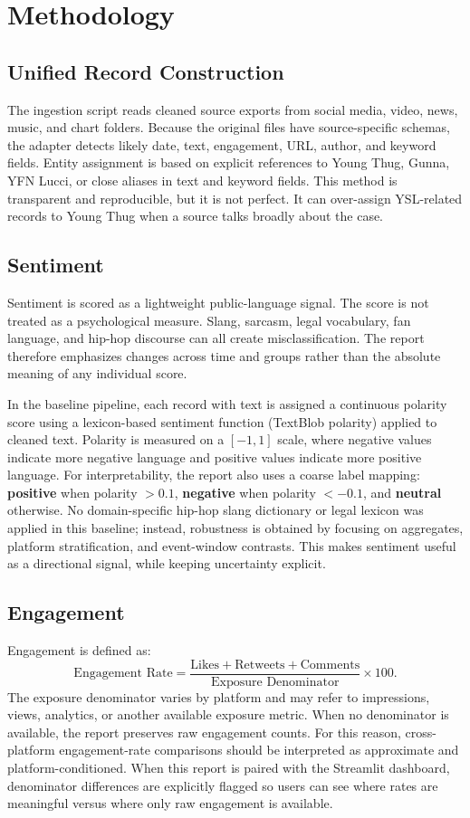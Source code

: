 \documentclass[12pt]{article}
\begin{document}
\section{Methodology}
\subsection{Unified Record Construction}
The ingestion script reads cleaned source exports from social media, video, news, music, and chart folders. Because the original files have source-specific schemas, the adapter detects likely date, text, engagement, URL, author, and keyword fields. Entity assignment is based on explicit references to Young Thug, Gunna, YFN Lucci, or close aliases in text and keyword fields. This method is transparent and reproducible, but it is not perfect. It can over-assign YSL-related records to Young Thug when a source talks broadly about the case.

\subsection{Sentiment}
Sentiment is scored as a lightweight public-language signal. The score is not treated as a psychological measure. Slang, sarcasm, legal vocabulary, fan language, and hip-hop discourse can all create misclassification. The report therefore emphasizes changes across time and groups rather than the absolute meaning of any individual score.

In the baseline pipeline, each record with text is assigned a continuous polarity score using a lexicon-based sentiment function (TextBlob polarity) applied to cleaned text. Polarity is measured on a \([-1, 1]\) scale, where negative values indicate more negative language and positive values indicate more positive language. For interpretability, the report also uses a coarse label mapping: \textbf{positive} when polarity \(> 0.1\), \textbf{negative} when polarity \(< -0.1\), and \textbf{neutral} otherwise. No domain-specific hip-hop slang dictionary or legal lexicon was applied in this baseline; instead, robustness is obtained by focusing on aggregates, platform stratification, and event-window contrasts. This makes sentiment useful as a directional signal, while keeping uncertainty explicit.

\subsection{Engagement}
Engagement is defined as:
\[
\text{Engagement Rate}
=
\frac{\text{Likes} + \text{Retweets} + \text{Comments}}
{\text{Exposure Denominator}}
\times 100.
\]
The exposure denominator varies by platform and may refer to impressions, views, analytics, or another available exposure metric. When no denominator is available, the report preserves raw engagement counts. For this reason, cross-platform engagement-rate comparisons should be interpreted as approximate and platform-conditioned. When this report is paired with the Streamlit dashboard, denominator differences are explicitly flagged so users can see where rates are meaningful versus where only raw engagement is available.
\end{document}
